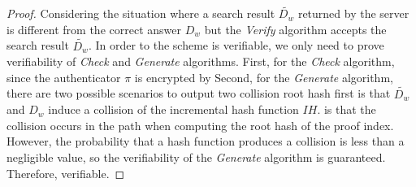 \begin{proof}
Considering the situation where a search result $\tilde{D_w}$ returned by the server is different from the correct answer $D_w$ but the {\it Verify} algorithm accepts the search result $\tilde{D_w}$. In order to  the \name scheme is verifiable, we only need to prove verifiability of {\it Check} and {\it Generate} algorithms. First, for the {\it Check} algorithm, since the authenticator $\pi$ is encrypted by  Second, for the {\it Generate} algorithm, there are two possible scenarios to output two collision root hash first is that $\tilde{D_w}$ and $D_w$ induce a collision of the incremental hash function $IH$.  is that the collision occurs in the path when computing the root hash of the proof index. However, the probability that a hash function produces a collision is less than a negligible value, so the verifiability of the {\it Generate} algorithm is guaranteed. Therefore,  verifiable.
\end{proof}
